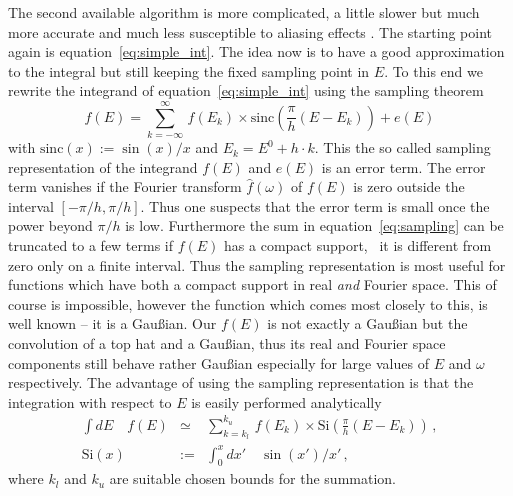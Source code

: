 The second available algorithm is more complicated, a little slower but
much more accurate and much less susceptible to aliasing effects
. The starting
point again is equation~\ref{eq:simple_int}. The idea now is to
 have a good approximation to the integral but still keeping the fixed sampling
point in $E$. To this end we rewrite the integrand of 
equation~\ref{eq:simple_int} using the sampling theorem~\cite{NRC,Rybicki}
\begin{equation}
\label{eq:sampling}
f(E)=\sum_{k=-\infty}^{\infty}\,f(E_k) 
\times \mathrm{sinc}\left(\frac{\pi}{h}(E-E_k)\right)+e(E)
\end{equation}
with $\mathrm{sinc}(x):=\sin(x)/x$ and $E_k=E^0+h\cdot k$. 
This the so called sampling 
representation of the integrand $f(E)$ and $e(E)$ is an error term.
The error term vanishes if the Fourier transform $\hat f(\omega)$ of $f(E)$
is zero outside the interval $[-\pi/h,\pi/h]$. Thus one suspects that
the error term is small once the power beyond $\pi/h$ is low. Furthermore
the sum in equation~\ref{eq:sampling} can be truncated to a few terms if
$f(E)$ has a compact support, \ie\ it is different from zero only 
on a finite interval. Thus the sampling representation is most useful
for functions which have both a compact support in real \emph{and} Fourier
space. This of course is impossible, however the function which comes
most closely to this, is well known -- it is a Gau\ss ian. Our $f(E)$ is not
exactly a Gau\ss ian  but the convolution of a top hat and a Gau\ss ian, thus
its real and Fourier space components still behave rather Gau\ss ian 
especially for large values of $E$ and $\omega$ respectively. The advantage of
using the sampling representation is that the integration with respect to $E$
is easily performed analytically
  \begin{eqnarray}
\label{eq:int_sampling}
\int dE \quad f(E)&\simeq& \sum_{k=k_{l}}^{k_{u}}\,f(E_k) 
\times \mathrm{Si}\left(\frac{\pi}{h}(E-E_k)\right)\,,\\
\mathrm{Si}(x)&:=&\int_{0}^x dx'\quad \sin(x')/x'\,,\nonumber 
\end{eqnarray}
where $k_l$ and $k_u$ are suitable chosen bounds for the summation.

